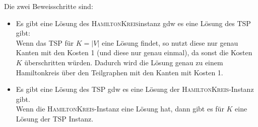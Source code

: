 \documentclass{article}
\begin{document}
Die zwei Beweisschritte sind:
\begin{itemize}
	\item Es gibt eine Lösung des \textsc{HamiltonKreis}instanz gdw es eine Lösung des \textsc{TSP} gibt: \\
        Wenn das TSP für $K = |V|$ eine Lösung findet, so nutzt diese nur genau Kanten mit den Kosten 1 (und diese nur genau einmal), da sonst die Kosten $K$ überschritten würden. Dadurch wird die Lösung genau zu einem Hamiltonkreis über den Teilgraphen mit den Kanten mit Kosten 1.
  \item Es gibt eine Lösung des \textsc{TSP} gdw es eine Lösung der \textsc{HamiltonKreis}-Instanz gibt. \\
        Wenn die \textsc{HamiltonKreis}-Instanz eine Lösung hat, dann gibt es für $K$ eine Lösung der TSP Instanz.
\end{itemize}
\end{document}
